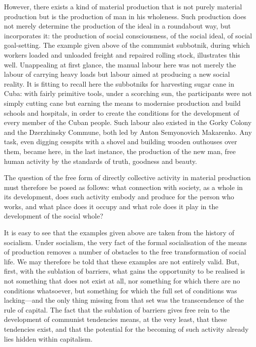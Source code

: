\documentclass[../main]{subfiles}
\begin{document}
However, there exists a kind of material production that is not purely material production but is the production of man in his wholeness. Such production does not merely determine the production of the ideal in a roundabout way, but incorporates it: the production of social consciousness, of the social ideal, of social goal-setting. The example given above of the communist subbotnik, during which workers loaded and unloaded freight and repaired rolling stock, illustrates this well. Unappealing at first glance, the manual labour here was not merely the labour of carrying heavy loads but labour aimed at producing a new social reality. It is fitting to recall here the subbotniks for harvesting sugar cane in Cuba: with fairly primitive tools, under a scorching sun, the participants were not simply cutting cane but earning the means to modernise production and build schools and hospitals, in order to create the conditions for the development of every member of the Cuban people. Such labour also existed in the Gorky Colony and the Dzerzhinsky Commune, both led by Anton Semyonovich Makarenko. Any task, even digging cesspits with a shovel and building wooden outhouses over them, became here, in the last instance, the production of the new man, free human activity by the standards of truth, goodness and beauty.

The question of the free form of directly collective activity in material production must therefore be posed as follows: what connection with society, as a whole in its development, does such activity embody and produce for the person who works, and what place does it occupy and what role does it play in the development of the social whole?

It is easy to see that the examples given above are taken from the history of socialism. Under socialism, the very fact of the formal socialisation of the means of production removes a number of obstacles to the free transformation of social life. We may therefore be told that these examples are not entirely valid. But, first, with the sublation of barriers, what gains the opportunity to be realised is not something that does not exist at all, nor something for which there are no conditions whatsoever, but something for which the full set of conditions was lacking—and the only thing missing from that set was the transcendence of the rule of capital. The fact that the sublation of barriers gives free rein to the development of communist tendencies means, at the very least, that these tendencies exist, and that the potential for the becoming of such activity already lies hidden within capitalism.
\end{document}
